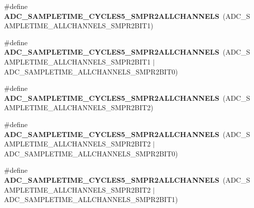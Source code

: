 \begin{DoxyCompactItemize}
\item 
\mbox{\label{group___a_d_c__sampling__times__all__channels_ga5917713e764d601159d80d6d01e8fe6a}} 
\#define {\bfseries A\+D\+C\+\_\+\+S\+A\+M\+P\+L\+E\+T\+I\+M\+E\+\_\+C\+Y\+C\+L\+E\+S5\+\_\+\+S\+M\+P\+R2\+A\+L\+L\+C\+H\+A\+N\+N\+E\+LS}~(A\+D\+C\+\_\+\+S\+A\+M\+P\+L\+E\+T\+I\+M\+E\+\_\+\+A\+L\+L\+C\+H\+A\+N\+N\+E\+L\+S\+\_\+\+S\+M\+P\+R2\+B\+I\+T1)
\item 
\mbox{\label{group___a_d_c__sampling__times__all__channels_gadb18fb6faaf51b50651e2e5a0203a0b3}} 
\#define {\bfseries A\+D\+C\+\_\+\+S\+A\+M\+P\+L\+E\+T\+I\+M\+E\+\_\+C\+Y\+C\+L\+E\+S5\+\_\+\+S\+M\+P\+R2\+A\+L\+L\+C\+H\+A\+N\+N\+E\+LS}~(A\+D\+C\+\_\+\+S\+A\+M\+P\+L\+E\+T\+I\+M\+E\+\_\+\+A\+L\+L\+C\+H\+A\+N\+N\+E\+L\+S\+\_\+\+S\+M\+P\+R2\+B\+I\+T1 $\vert$ A\+D\+C\+\_\+\+S\+A\+M\+P\+L\+E\+T\+I\+M\+E\+\_\+\+A\+L\+L\+C\+H\+A\+N\+N\+E\+L\+S\+\_\+\+S\+M\+P\+R2\+B\+I\+T0)
\item 
\mbox{\label{group___a_d_c__sampling__times__all__channels_ga6b9be33f3d49006a74ef909dc08fe6e7}} 
\#define {\bfseries A\+D\+C\+\_\+\+S\+A\+M\+P\+L\+E\+T\+I\+M\+E\+\_\+C\+Y\+C\+L\+E\+S5\+\_\+\+S\+M\+P\+R2\+A\+L\+L\+C\+H\+A\+N\+N\+E\+LS}~(A\+D\+C\+\_\+\+S\+A\+M\+P\+L\+E\+T\+I\+M\+E\+\_\+\+A\+L\+L\+C\+H\+A\+N\+N\+E\+L\+S\+\_\+\+S\+M\+P\+R2\+B\+I\+T2)
\item 
\mbox{\label{group___a_d_c__sampling__times__all__channels_ga6805f24c0b6a743158270cefb208a633}} 
\#define {\bfseries A\+D\+C\+\_\+\+S\+A\+M\+P\+L\+E\+T\+I\+M\+E\+\_\+C\+Y\+C\+L\+E\+S5\+\_\+\+S\+M\+P\+R2\+A\+L\+L\+C\+H\+A\+N\+N\+E\+LS}~(A\+D\+C\+\_\+\+S\+A\+M\+P\+L\+E\+T\+I\+M\+E\+\_\+\+A\+L\+L\+C\+H\+A\+N\+N\+E\+L\+S\+\_\+\+S\+M\+P\+R2\+B\+I\+T2 $\vert$ A\+D\+C\+\_\+\+S\+A\+M\+P\+L\+E\+T\+I\+M\+E\+\_\+\+A\+L\+L\+C\+H\+A\+N\+N\+E\+L\+S\+\_\+\+S\+M\+P\+R2\+B\+I\+T0)
\item 
\mbox{\label{group___a_d_c__sampling__times__all__channels_ga821e81d0582c2a28d87d4e444ab7753c}} 
\#define {\bfseries A\+D\+C\+\_\+\+S\+A\+M\+P\+L\+E\+T\+I\+M\+E\+\_\+C\+Y\+C\+L\+E\+S5\+\_\+\+S\+M\+P\+R2\+A\+L\+L\+C\+H\+A\+N\+N\+E\+LS}~(A\+D\+C\+\_\+\+S\+A\+M\+P\+L\+E\+T\+I\+M\+E\+\_\+\+A\+L\+L\+C\+H\+A\+N\+N\+E\+L\+S\+\_\+\+S\+M\+P\+R2\+B\+I\+T2 $\vert$ A\+D\+C\+\_\+\+S\+A\+M\+P\+L\+E\+T\+I\+M\+E\+\_\+\+A\+L\+L\+C\+H\+A\+N\+N\+E\+L\+S\+\_\+\+S\+M\+P\+R2\+B\+I\+T1)

\end{DoxyCompactItemize}
